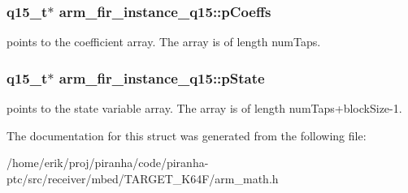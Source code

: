 \subsubsection[{\texorpdfstring{p\+Coeffs}{pCoeffs}}]{\setlength{\rightskip}{0pt plus 5cm}q15\+\_\+t$\ast$ arm\+\_\+fir\+\_\+instance\+\_\+q15\+::p\+Coeffs}\hypertarget{structarm__fir__instance__q15_a6d16db16a5f8f0db54938f2967244d9e}{}\label{structarm__fir__instance__q15_a6d16db16a5f8f0db54938f2967244d9e}
points to the coefficient array. The array is of length num\+Taps. 
\subsubsection[{\texorpdfstring{p\+State}{pState}}]{\setlength{\rightskip}{0pt plus 5cm}q15\+\_\+t$\ast$ arm\+\_\+fir\+\_\+instance\+\_\+q15\+::p\+State}\hypertarget{structarm__fir__instance__q15_aa8d25f44f45b6a6c4cf38c31569b8a01}{}\label{structarm__fir__instance__q15_aa8d25f44f45b6a6c4cf38c31569b8a01}
points to the state variable array. The array is of length num\+Taps+block\+Size-\/1. 

The documentation for this struct was generated from the following file\+:\begin{DoxyCompactItemize}
\item 
/home/erik/proj/piranha/code/piranha-\/ptc/src/receiver/mbed/\+T\+A\+R\+G\+E\+T\+\_\+\+K64\+F/arm\+\_\+math.\+h\end{DoxyCompactItemize}
